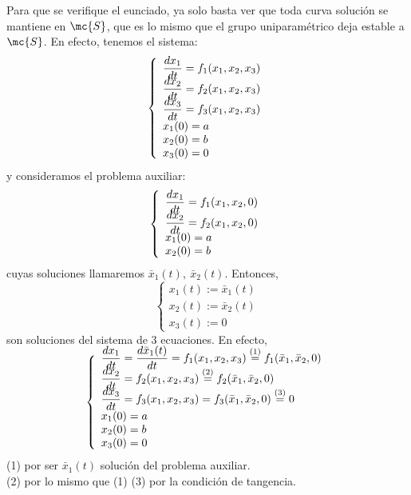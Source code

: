 \begin{dem}
    Para que se verifique el eunciado, ya solo basta ver que toda curva solución se mantiene en $\mc{S}$, que es lo mismo que el grupo uniparamétrico deja estable a $\mc{S}$. En efecto, tenemos el sistema:  
    $$\left\{ \begin{array}{l}
         \dfrac{dx_1}{dt}=f_1(x_1,x_2,x_3) \\
         \vspace{-5mm} \\
         \dfrac{dx_2}{dt}=f_2(x_1,x_2,x_3) \\
         \vspace{-5mm} \\
         \dfrac{dx_3}{dt}=f_3(x_1,x_2,x_3) \\
         x_1(0)=a \\
         x_2(0)=b \\
         x_3(0)=0
    \end{array} \right.$$
    y consideramos el problema auxiliar:
        $$\left\{ \begin{array}{l}
         \dfrac{dx_1}{dt}=f_1(x_1,x_2,0) \\
         \vspace{-5mm} \\
         \dfrac{dx_2}{dt}=f_2(x_1,x_2,0) \\
         \vspace{-5mm} \\
         x_1(0)=a \\
         x_2(0)=b 
    \end{array} \right.$$
    cuyas soluciones llamaremos $\bar{x}_1(t), \: \bar{x}_2(t)$. Entonces, 
    $$\left\{ \begin{array}{l}
         x_1(t):=\bar{x}_1(t)\\
         x_2(t):=\bar{x}_2(t)\\
         x_3(t):=0
    \end{array} \right.$$
    son soluciones del sistema de 3 ecuaciones. En efecto, 
    $$\left\{ \begin{array}{l}
         \vspace{-7mm}\\
         \dfrac{dx_1}{dt}=\dfrac{d\bar{x}_1(t)}{dt}=f_1(x_1,x_2,x_3)\overset{(1)}{=} f_1(\bar{x}_1,\bar{x}_2,0) \\
         \vspace{-5mm} \\
         \dfrac{dx_2}{dt}=f_2(x_1,x_2,x_3)\overset{(2)}{=} f_2(\bar{x}_1,\bar{x}_2,0) \\
         \vspace{-5mm} \\
         \dfrac{dx_3}{dt}=f_3(x_1,x_2,x_3)=f_3(\bar{x}_1,\bar{x}_2,0)\overset{(3)}{=}0 \\
         x_1(0)=a \\
         x_2(0)=b \\
         x_3(0)=0
    \end{array} \right.$$
    (1) por ser $\bar x _1(t)$ solución del problema auxiliar.\\
    (2) por lo mismo que (1)
    (3) por la condición de tangencia.


\end{dem}
